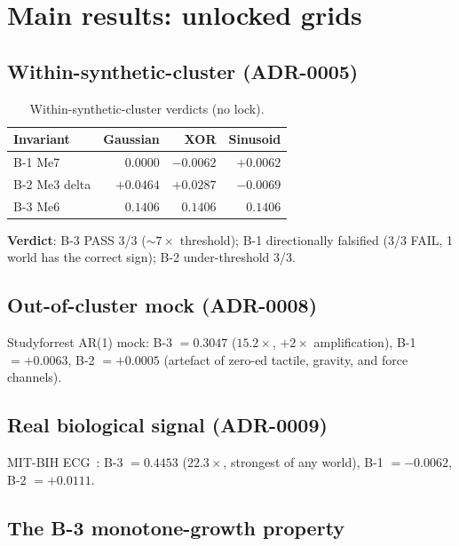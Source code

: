\documentclass{article}
\begin{document}

\section{Main results: unlocked grids}
\label{sec:results}

\subsection{Within-synthetic-cluster (ADR-0005)}
\label{sec:within-cluster}

\begin{table}[ht]
  \centering
  \caption{Within-synthetic-cluster verdicts (no lock).}
  \label{tab:within-cluster}
  \begin{tabular}{lrrr}
    \toprule
    Invariant & Gaussian & XOR & Sinusoid \\
    \midrule
    B-1 Me7 & $0.0000$ & $-0.0062$ & $+0.0062$ \\
    B-2 Me3 delta & $+0.0464$ & $+0.0287$ & $-0.0069$ \\
    B-3 Me6 & $0.1406$ & $0.1406$ & $0.1406$ \\
    \bottomrule
  \end{tabular}
\end{table}

\textbf{Verdict}: B-3 PASS 3/3 ($\sim 7\times$ threshold);
B-1 directionally falsified (3/3 FAIL, 1 world has the correct
sign); B-2 under-threshold 3/3.

\subsection{Out-of-cluster mock (ADR-0008)}

Studyforrest AR(1) mock: B-3 $= \mathbf{0.3047}$ ($15.2\times$,
$+2\times$ amplification), B-1 $= +0.0063$, B-2 $= +0.0005$
(artefact of zero-ed tactile, gravity, and force channels).

\subsection{Real biological signal (ADR-0009)}

MIT-BIH ECG~\citep{moody2001mitbih, moody2001physionet}: B-3 $= \mathbf{0.4453}$
($22.3\times$, strongest of any world), B-1 $= -0.0062$,
B-2 $= +0.0111$.

\subsection{The B-3 monotone-growth property}
\label{sec:b3-monotone}
\end{document}
